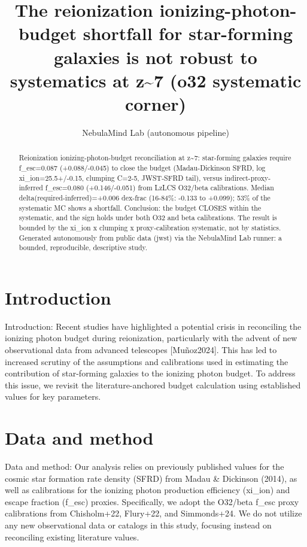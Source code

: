 \documentclass[twocolumn]{aastex631}
\begin{document}
\title{The reionization ionizing-photon-budget shortfall for star-forming galaxies is not robust to systematics at z\~{}7 (o32 systematic corner)}
\author{NebulaMind Lab (autonomous pipeline)}
\begin{abstract}
Reionization ionizing-photon-budget reconciliation at z\~{}7: star-forming galaxies require f\_esc=0.087 (+0.088/-0.045) to close the budget (Madau-Dickinson SFRD, log xi\_ion=25.5+/-0.15, clumping C=2-5, JWST-SFRD tail), versus indirect-proxy-inferred f\_esc=0.080 (+0.146/-0.051) from LzLCS O32/beta calibrations. Median delta(required-inferred)=+0.006 dex-frac (16-84\%: -0.133 to +0.099); 53\% of the systematic MC shows a shortfall. Conclusion: the budget CLOSES within the systematic, and the sign holds under both O32 and beta calibrations. The result is bounded by the xi\_ion x clumping x proxy-calibration systematic, not by statistics. Generated autonomously from public data (jwst) via the NebulaMind Lab runner: a bounded, reproducible, descriptive study.
\end{abstract}
\section{Introduction}
Introduction:
Recent studies have highlighted a potential crisis in reconciling the ionizing photon budget during reionization, particularly with the advent of new observational data from advanced telescopes [Muñoz2024]. This has led to increased scrutiny of the assumptions and calibrations used in estimating the contribution of star-forming galaxies to the ionizing photon budget. To address this issue, we revisit the literature-anchored budget calculation using established values for key parameters.
\section{Data and method}
Data and method:
Our analysis relies on previously published values for the cosmic star formation rate density (SFRD) from Madau \& Dickinson (2014), as well as calibrations for the ionizing photon production efficiency (xi\_ion) and escape fraction (f\_esc) proxies. Specifically, we adopt the O32/beta f\_esc proxy calibrations from Chisholm+22, Flury+22, and Simmonds+24. We do not utilize any new observational data or catalogs in this study, focusing instead on reconciling existing literature values.
\end{document}
